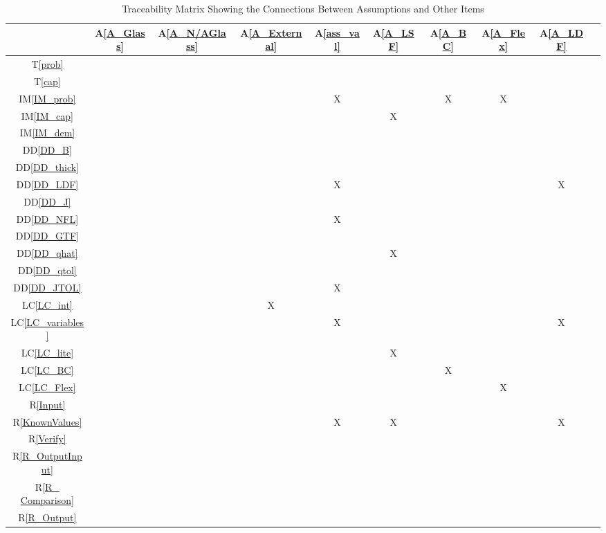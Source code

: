 \documentclass[12pt]{article}
\newcommand{\ddref}[1]{DD\ref{#1}}
\newcommand{\tref}[1]{T\ref{#1}}
\newcommand{\aref}[1]{A\ref{#1}}
\newcommand{\iref}[1]{IM\ref{#1}}
\newcommand{\rref}[1]{R\ref{#1}}
\newcommand{\lcref}[1]{LC\ref{#1}}
\begin{document}
\begin{table}[h!]
\centering
\begin{tabular}{|c|c|c|c|c|c|c|c|c|c|}
\hline
	& \aref{A_Glass}& \aref{A_N/AGlass}& \aref{A_External}& \aref{ass_val}& 
	\aref{A_LSF}& \aref{A_BC}& \aref{A_Flex}& \aref{A_LDF}\\
\hline
\tref{prob}                 & & & & & & & & \\ \hline
\tref{cap}                  & & & & & & & & \\ \hline
\iref{IM_prob}           & & & & X & & X & X & \\ \hline
\iref{IM_cap}             & & & & & X & & & \\ \hline
\iref{IM_dem}            & & & & & & & & \\ \hline
\ddref{DD_B}            & & & & & & & & \\ \hline
\ddref{DD_thick}       & & & & & & & & \\ \hline
\ddref{DD_LDF}        & & & & X & & & & X \\ \hline
\ddref{DD_J}             & & & & & & & & \\ \hline
\ddref{DD_NFL}        & & & & X & & & & \\ \hline
\ddref{DD_GTF}        & & & & & & & & \\ \hline
\ddref{DD_qhat}        & & & & & X & & & \\ \hline
\ddref{DD_qtol}         & & & & & & & & \\ \hline
\ddref{DD_JTOL}      & & & & X & & & & \\ \hline
\lcref{LC_int}             & & & X & & & & & \\ \hline
\lcref{LC_variables}   & & & & X & & & & X \\ \hline
\lcref{LC_lite}             & & & & & X & & & \\ \hline
\lcref{LC_BC}             & & & & & & X & & \\ \hline
\lcref{LC_Flex}           & & & & & & & X &\\ \hline
\rref{Input}                  & & & & & & & & \\ \hline
\rref{KnownValues}     & & & & X & X & & & X \\ \hline
\rref{Verify}                 & & & & & & & & \\ \hline
\rref{R_OutputInput}   & & & & & & & & \\ \hline
\rref{R_ Comparison} & & & & & & & & \\ \hline
\rref{R_Output}           & & & & & & & & \\
\hline
\end{tabular}
\caption{Traceability Matrix Showing the Connections Between Assumptions and Other Items}
\label{Table:A_trace}
\end{table}
\end{document}
